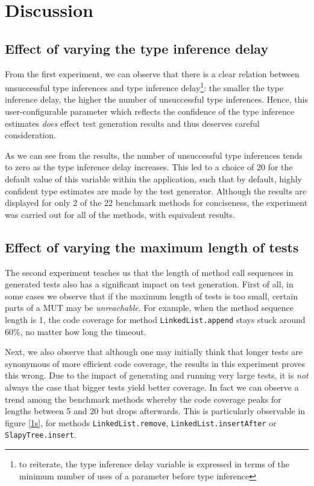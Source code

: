 \section{Discussion}
\subsection{Effect of varying the type inference delay}
From the first experiment, we can observe that there is a clear relation between unsuccessful type inferences and type inference delay\footnote{to reiterate, the type inference delay variable is expressed in terms of the minimum number of uses of a parameter before type inference}: the smaller the type inference delay, the higher the number of unsuccessful type inferences. Hence, this user-configurable parameter which reflects the confidence of the type inference estimates \emph{does} effect test generation results and thus deserves careful consideration.

As we can see from the results, the number of unsuccessful type inferences tends to zero as the type inference delay increases. This led to a choice of 20 for the default value of this variable within the application, such that by default, highly confident type estimates are made by the test generator. Although the results are displayed for only 2 of the 22 benchmark methods for conciseness, the experiment was carried out for all of the methods, with equivalent results.

\subsection{Effect of varying the maximum length of tests}
The second experiment teaches us that the length of method call sequences in generated tests also has a significant impact on test generation. First of all, in some cases we observe that if the maximum length of tests is too small, certain parts of a MUT may be \emph{unreachable}. For example, when the method sequence length is 1, the code coverage for method \texttt{LinkedList.append} stays stuck around 60\%, no matter how long the timeout.

Next, we also observe that although one may initially think that longer tests are synonymous of more efficient code coverage, the results in this experiment proves this wrong. Due to the impact of generating and running very large tests, it is \emph{not} always the case that bigger tests yield better coverage. In fact we can observe a trend among the benchmark methods whereby the code coverage peaks for lengths between 5 and 20 but drops afterwards. This is particularly observable in figure \ref{1s}, for methods \texttt{LinkedList.remove}, \texttt{LinkedList.insertAfter} or \texttt{SlapyTree.insert}.


